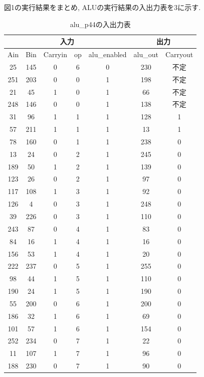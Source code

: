 \documentclass[12pt]{jreport}
\begin{document}
        図1の実行結果をまとめ, ALUの実行結果の入出力表を3に示す. 

        \begin{table}[htb]
          \begin{center}
            \caption{alu\_p44の入出力表}
            \begin{tabular} {|c|c|c|c|c|c|c|} \hline
                \multicolumn{5}{|c|}{入力} & \multicolumn{2}{|c|}{出力} \\ \hline \hline
                Ain & Bin & Carryin & op & alu\_enabled & alu\_out & Carryout \\ \hline
                25 & 145 & 0 & 6 & 0 & 230 & 不定 \\ \hline
                251 & 203 & 0 & 0 & 1 & 198 & 不定 \\ \hline
                21 & 45 & 1 & 0 & 1 & 66 & 不定 \\ \hline
                248 & 146 & 0 & 0 & 1 & 138 & 不定 \\ \hline
                31 & 96 & 1 & 1 & 1 & 128  & 1 \\ \hline
                57 & 211 & 1 & 1 & 1 & 13 & 1 \\ \hline
                78 & 160 & 0 & 1 & 1 & 238 & 0 \\ \hline
                13 & 24 & 0 & 2 & 1 & 245 & 0 \\ \hline
                189 & 50 & 1 & 2 & 1 & 139 & 0 \\ \hline
                123 & 26 & 0 & 2 & 1 & 97 & 0 \\ \hline
                117 & 108 & 1 & 3 & 1 & 92 & 0 \\ \hline
                126 & 4 &  0 & 3 & 1 & 248 & 0 \\ \hline
                39 & 226 & 0 & 3 & 1 & 110 & 0 \\ \hline
                243 & 87 & 0 & 4 & 1 & 83 & 0 \\ \hline
                84 & 16 & 1 & 4 & 1 & 16 & 0 \\ \hline
                156 & 53 & 1 & 4 & 1 & 20 & 0 \\ \hline
                222 & 237 & 0 & 5 & 1 & 255 & 0 \\ \hline
                98 & 44 & 1 & 5 & 1 & 110 & 0 \\ \hline
                190 & 24 & 1 & 5 & 1 & 190 & 0 \\ \hline
                55 & 200 & 0 & 6 & 1 & 200 & 0 \\ \hline
                186 & 32 & 1 & 6 & 1 & 69 & 0 \\ \hline
                101 & 57 & 1 & 6 & 1 & 154 & 0 \\ \hline
                252 & 234 & 0 & 7 & 1 & 22 & 0 \\ \hline
                11 & 107 & 1 & 7 & 1 & 96 & 0 \\ \hline
                188 & 230 & 0 & 7 & 1 & 90 & 0 \\ \hline
            \end{tabular}
          \end{center}
        \end{table}
\end{document}
